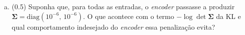 \documentclass[11pt,a4paper]{article}
\begin{document}
\begin{enumerate}[1)]
\begin{enumerate}[a)]
    \item (0.5) Suponha que, para todas as entradas, o \textit{encoder} passasse a produzir $\boldsymbol{\Sigma} = \mathrm{diag}(10^{-6},\, 10^{-6})$. O que acontece com o termo $-\log\det\boldsymbol{\Sigma}$ da KL e qual comportamento indesejado do \textit{encoder} essa penalização evita?
    \vspace{2.5cm}
\end{enumerate}

\end{enumerate}
\end{document}
